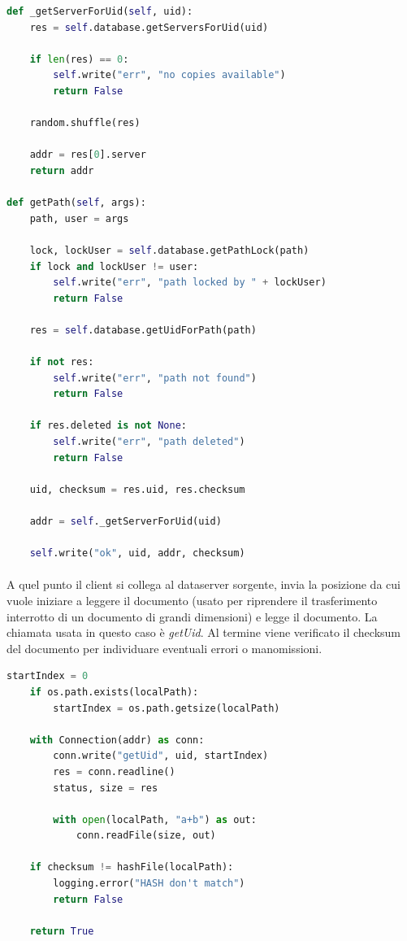 \documentclass[11pt,a4paper,english]{article}
\begin{document}
\begin{lstlisting}[language=Python, title=Metaserver]
def _getServerForUid(self, uid):
	res = self.database.getServersForUid(uid)
	
	if len(res) == 0:
		self.write("err", "no copies available")
		return False
	
	random.shuffle(res)
	
	addr = res[0].server
	return addr	

def getPath(self, args):
    path, user = args

    lock, lockUser = self.database.getPathLock(path)
    if lock and lockUser != user:
        self.write("err", "path locked by " + lockUser)
        return False

    res = self.database.getUidForPath(path)

    if not res:
        self.write("err", "path not found")
        return False

    if res.deleted is not None:
        self.write("err", "path deleted")
        return False

    uid, checksum = res.uid, res.checksum

    addr = self._getServerForUid(uid)

    self.write("ok", uid, addr, checksum)
\end{lstlisting}

\paragraph{} A quel punto il client si collega al dataserver sorgente, invia la posizione da cui vuole iniziare a leggere il documento (usato per riprendere il trasferimento interrotto di un documento di grandi dimensioni) e legge il documento. La chiamata usata in questo caso è \emph{getUid}. Al termine viene verificato il checksum del documento per individuare eventuali errori o manomissioni. 

\begin{lstlisting}[language=Python, title=Client]
    startIndex = 0
    if os.path.exists(localPath):
        startIndex = os.path.getsize(localPath)

    with Connection(addr) as conn:
        conn.write("getUid", uid, startIndex)
        res = conn.readline()
        status, size = res

        with open(localPath, "a+b") as out:
            conn.readFile(size, out)

    if checksum != hashFile(localPath):
        logging.error("HASH don't match")
        return False

    return True
\end{lstlisting}
\end{document}
